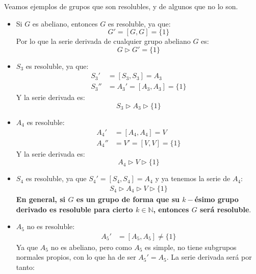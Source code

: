 \begin{ejemplo}
    Veamos ejemplos de grupos que son resolubles, y de algunos que no lo son.
    \begin{itemize}
        \item Si $G$ es abeliano, entonces $G$ es resoluble, ya que:
            \begin{equation*}
                G' = [G, G] = \{1\}
            \end{equation*}
            Por lo que la serie derivada de cualquier grupo abeliano $G$ es:
            \begin{equation*}
                G \rhd G' = \{1\}
            \end{equation*}
        \item $S_3$ es resoluble, ya que:
            \begin{align*}
                S_3' &= [S_3,S_3] = A_3 \\
                S_3'' &= A_3' = [A_3, A_3] = \{1\}
            \end{align*}
            Y la serie derivada es:
            \begin{equation*}
                S_3 \rhd A_3 \rhd \{1\}
            \end{equation*}
        \item $A_4$ es resoluble:
            \begin{align*}
                A_4' &= [A_4, A_4] = V \\
                A_4'' &= V' = [V, V] = \{1\}
            \end{align*}
            Y la serie derivada es:
            \begin{equation*}
                A_4 \rhd V \rhd \{1\}
            \end{equation*}
        \item $S_4$ es resoluble, ya que $S_4' = [S_4, S_4] = A_4$ y ya tenemos la serie de $A_4$:
            \begin{align*}
                S_4 \rhd A_4 \rhd V \rhd \{1\}
            \end{align*}
            \textbf{En general, si $G$ es un grupo de forma que su $k-$ésimo grupo derivado es resoluble para cierto $k\in \mathbb{N}$, entonces $G$ será resoluble}.
        \item $A_5$ no es resoluble:
            \begin{align*}
                A_5' &= [A_5, A_5] \neq \{1\}
            \end{align*}
            Ya que $A_5$ no es abeliano, pero como $A_5$ es simple, no tiene subgrupos normales propios, con lo que ha de ser $A_5' = A_5$. La serie derivada será por tanto:

\end{itemize}
\end{ejemplo}
